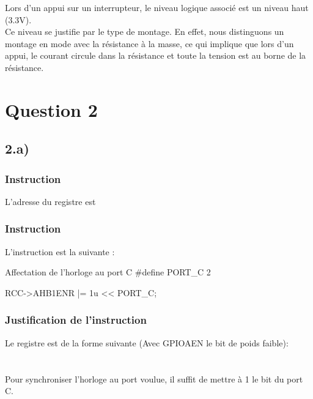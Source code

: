 Lors d'un appui sur un interrupteur, le niveau logique associé est un niveau haut (3.3V). \\
Ce niveau se justifie par le type de montage. En effet, nous distinguons un montage en mode  
avec la résistance à la masse, ce qui implique que lors d'un appui, le courant circule dans
la résistance et toute la tension est au borne de la résistance.


\section{Question 2}

\subsection{2.a)}
\subsubsection*{Instruction}
L'adresse du registre  est 

\subsubsection{Instruction}
L'instruction est la suivante : 

\begin{Cpp}{Affectation de l'horloge au port C}
#define PORT_C 2

RCC->AHB1ENR |= 1u << PORT_C;	
\end{Cpp}
\subsubsection{Justification de l'instruction}

Le registre  est de la forme suivante (Avec GPIOAEN le bit de poids faible): \\
     \\
    \quad\quad \quad\quad {}   \quad\quad \quad\quad          {}    \quad\quad \quad\quad  {}    \quad\quad \quad\quad{}\\



Pour synchroniser l'horloge au port voulue, il suffit de mettre à 1 le bit du port C.

